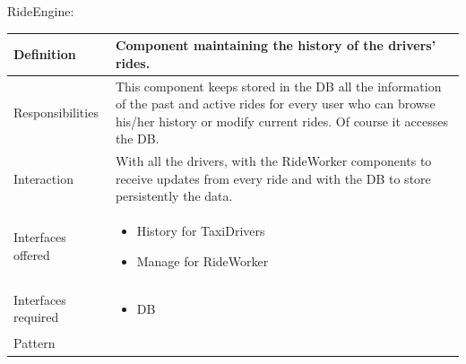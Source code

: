 \documentclass[a4paper,11pt]{report} %
\begin{document}
	\pagebreak
	\vspace*{-0.35cm}
	\centerline{RideEngine:}
	\begin{center}
		\begin{tabular}{| l | p{9cm} |}\hline
			Definition & Component maintaining the history of the drivers' rides.\\\hline
			Responsibilities & This component keeps stored in the DB all the information of the past and active rides for every user who can browse his/her history or modify current rides. Of course it accesses the DB.\\\hline
			Interaction & With all the drivers, with the RideWorker components to receive updates from every ride and with the DB to store persistently the data.\\\hline
			Interfaces offered & \begin{itemize}
				\item History for TaxiDrivers
				\item Manage for RideWorker
			\end{itemize}\\\hline
			Interfaces required & \begin{itemize}
				\item DB
			\end{itemize}\\\hline
			Pattern & \\\hline
		\end{tabular}
	\end{center}		
	
\end{document}
